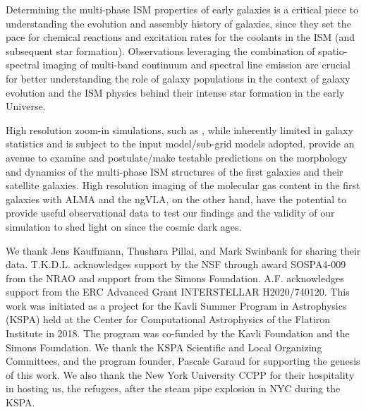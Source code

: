 \documentclass[iop]{emulateapj}
\begin{document}
Determining the multi-phase ISM properties of early galaxies
is a critical piece to understanding the evolution and
assembly history of galaxies, since they set the pace
for chemical reactions and excitation rates for the coolants in the ISM (and subsequent star formation).
Observations leveraging the combination of spatio-spectral imaging of
multi-band continuum and spectral line emission are crucial for better understanding
the role of \highz galaxy populations
in the context of galaxy evolution and the ISM physics behind their intense star formation in the early Universe.

High resolution zoom-in simulations, such as , while inherently limited in galaxy
statistics and is subject to the input model/sub-grid models adopted, 
provide an avenue to examine and postulate/make testable predictions on the morphology and dynamics of
the multi-phase ISM structures of the first galaxies and their satellite galaxies.
High resolution imaging of the molecular gas content in the first galaxies with ALMA and the ngVLA, on the other hand,
have the potential to provide useful observational data to test our findings and the validity of our simulation to shed
light on \SF since the cosmic dark ages.



\acknowledgements

We thank Jens Kauffmann, Thushara Pillai, and Mark Swinbank for sharing their data.
T.K.D.L. acknowledges support by the NSF through award SOSPA4-009
from the NRAO and support from the Simons Foundation.
A.F. acknowledges support from the ERC Advanced Grant INTERSTELLAR H2020/740120.
This work was initiated as a project for the Kavli Summer Program in Astrophysics (KSPA)
held at the Center for
Computational Astrophysics of the Flatiron Institute in 2018. The program was co-funded by the Kavli
Foundation and the Simons Foundation.
We thank the KSPA Scientific and Local Organizing Committees, and the program founder,
Pascale Garaud for supporting the genesis of this work.
We also thank the New York University CCPP for their hospitality in hosting us, the refugees, after the steam pipe explosion in NYC during the KSPA.
\end{document}
